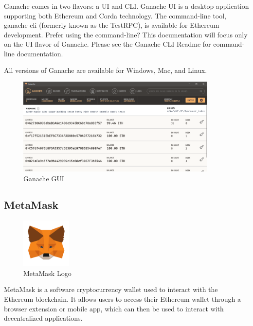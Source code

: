 Ganache comes in two flavors: a UI and CLI. Ganache UI is a desktop application supporting both Ethereum and Corda technology. The command-line tool, ganache-cli (formerly known as the TestRPC), is available for Ethereum development. Prefer using the command-line? This documentation will focus only on the UI flavor of Ganache. Please see the Ganache CLI Readme for command-line documentation.

All versions of Ganache are available for Windows, Mac, and Linux\cite{trufflecommunityGanacheOverviewDocumentation}.

\begin{figure}[H]
	\centering
		\includegraphics[width=10cm]{images/chapter3/ganache-window.png}
		\caption{{\footnotesize Ganache GUI}}
\end{figure}

\subsection{MetaMask}

\begin{figure}
	\vspace{-10pt}
	\includegraphics[width=2.5cm]{images/chapter3/metamask-logo.png}
	\vspace{-10pt}
	\caption{{\footnotesize MetaMask Logo}}
\end{figure}

MetaMask is a software cryptocurrency wallet used to interact with the Ethereum blockchain.\cite{stanschroederCryptoWalletMetaMask2021} It allows users to access their Ethereum wallet through a browser extension or mobile app, which can then be used to interact with decentralized applications.

